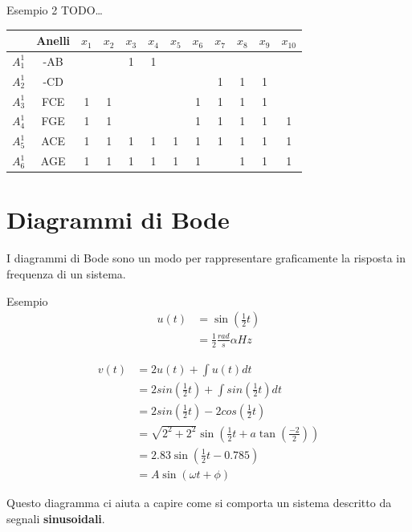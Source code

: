 \documentclass[a4paper]{article}
\begin{document}
\begin{examplebox}{Esempio 2}
    TODO\dots
    \begin{table}[H]
        \begin{tabular}{|c|c|c|c|c|c|c|c|c|c|c|c|}
            \hline
            & Anelli & $x_1$ & $x_2$ & $x_3$ & $x_4$ & $x_5$ & $x_6$ & $x_7$ & $x_8$ & $x_9$ & $x_{10}$\\
            \hline
            $A_1^1$ & -AB &  &  & 1 & 1 &  &  &  &  &  & \\
            \hline
            $A_2^1$& -CD & &  &  &  & &  & 1 & 1 & 1 & \\
            \hline
            $A_3^1$ & FCE & 1 & 1 &  &  &  & 1 & 1 & 1 & 1 & \\
            \hline
            $A_4^1$ & FGE & 1 & 1 &  &  &  & 1 & 1 & 1 & 1 & 1\\
            \hline
            $A_5^1$& ACE & 1 & 1 & 1 & 1 & 1 & 1 & 1 & 1 & 1 & 1\\
            \hline
            $A_6^1$ & AGE & 1 & 1 & 1 & 1 & 1 & 1 &  & 1 & 1 & 1\\
            \hline
        \end{tabular}
    \end{table}
\end{examplebox}

\section{Diagrammi di Bode}

I diagrammi di Bode sono un modo per rappresentare graficamente la risposta in frequenza di un sistema.

\begin{examplebox}{Esempio}
    \begin{align*}
        u(t) &= \sin\left(\frac{1}{2}t\right)\\
        &= \frac{1}{2}\frac{rad}{s}\alpha Hz
    \end{align*}
    
    \begin{align*}
        v(t) &= 2u(t) + \int u(t)dt\\
        &= 2sin\left(\frac{1}{2}t\right) + \int sin\left(\frac{1}{2}t\right)dt\\
        &= 2sin\left(\frac{1}{2}t\right) - 2cos\left(\frac{1}{2}t\right)\\
        &= \sqrt{2^2+2^2} \sin\left(\frac{1}{2}t + a\tan\left(\frac{-2}{2}\right)\right)\\
        &= 2.83 \sin\left(\frac{1}{2}t - 0.785\right)\\
        &= A \sin(\omega t + \phi)
    \end{align*}
\end{examplebox}
\noindent
Questo diagramma ci aiuta a capire come si comporta un sistema descritto da segnali
\textbf{sinusoidali}. 
\end{document}
